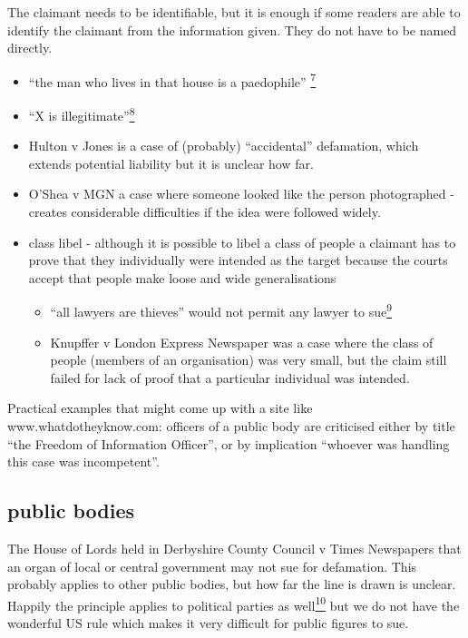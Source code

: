 \documentclass[]{article}
\begin{document}
The claimant needs to be identifiable, but it is enough if some readers
are able to identify the claimant from the information given. They do
not have to be named directly.

\begin{itemize}
\item
  ``{the man who lives in that house is a paedophile''
  \hyperref[sdfootnote7sym]{\textsuperscript{7}}}
\item
  ``{X is illegitimate''\hyperref[sdfootnote8sym]{\textsuperscript{8}}}
\item
  Hulton v Jones is a case of (probably) ``accidental'' defamation,
  which extends potential liability but it is unclear how far.
\item
  O'Shea v MGN a case where someone looked like the person photographed
  - creates considerable difficulties if the idea were followed widely.
\item
  class libel - although it is possible to libel a class of people a
  claimant has to prove that they individually were intended as the
  target because the courts accept that people make loose and wide
  generalisations

  \begin{itemize}
  \item
    ``{all lawyers are thieves'' would not permit any lawyer to
    sue\hyperref[sdfootnote9sym]{\textsuperscript{9}}}
  \item
    Knupffer v London Express Newspaper was a case where the class of
    people (members of an organisation) was very small, but the claim
    still failed for lack of proof that a particular individual was
    intended.
  \end{itemize}
\end{itemize}

Practical examples that might come up with a site like www.whatdotheyknow.com: officers of a public body are criticised either by title ``the Freedom of Information Officer'', or by implication ``whoever was handling this case was incompetent''.

\subsection{public bodies}

{The House of Lords held in Derbyshire County Council v Times Newspapers
that an organ of local or central government may not sue for defamation.
This probably applies to other public bodies, but how far the line is
drawn is unclear. Happily the principle applies to political parties as
well\hyperref[sdfootnote10sym]{\textsuperscript{10}} but we do not have
the wonderful US rule which makes it very difficult for public figures
to sue.}
\end{document}

